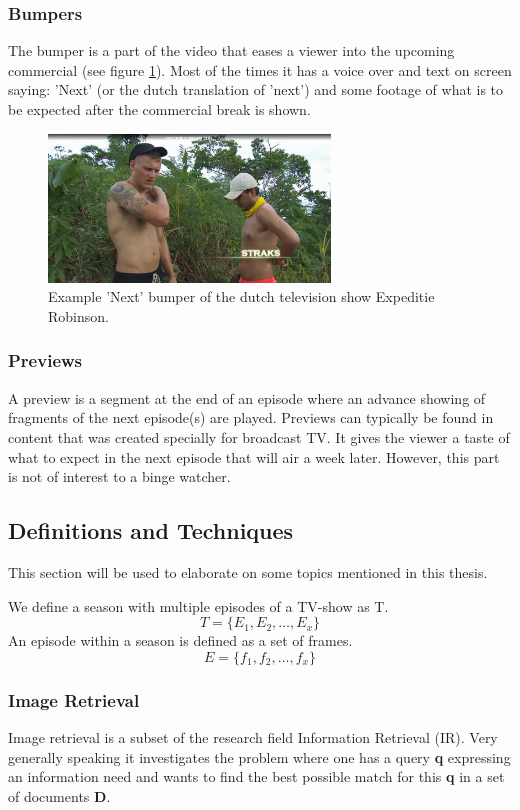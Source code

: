 \documentclass{article}
\begin{document}
\subsubsection{Bumpers}
The bumper is a part of the video that eases a viewer into the upcoming commercial (see figure \ref{examplebumper}). Most of the times it has a voice over and text on screen saying: 'Next' (or the dutch translation of 'next') and some footage of what is to be expected after the commercial break is shown.

\begin{figure}[H]
    \includegraphics[width=7.5cm]{images/straks.png}
    \centering
    \caption{Example 'Next' bumper of the dutch television show Expeditie Robinson.}
    \label{examplebumper}
\end{figure}

\subsubsection{Previews}
A preview is a segment at the end of an episode where an advance showing of fragments of the next episode(s) are played. Previews can typically be found in content that was created specially for broadcast TV. It gives the viewer a taste of what to expect in the next episode that will air a week later. However, this part is not of interest to a binge watcher.

\subsection{Definitions and Techniques}
This section will be used to elaborate on some topics mentioned in this thesis.

We define a season with multiple episodes of a TV-show as T.
\[T = \{E_1, E_2, \dots, E_x\}\]
An episode within a season is defined as a set of frames.
\[E = \{f_1, f_2, \dots, f_x\}\]


\subsubsection{Image Retrieval}
Image retrieval is a subset of the research field Information Retrieval (IR). Very generally speaking it investigates the problem where one has a query \textbf{q} expressing an information need and wants to find the best possible match for this \textbf{q} in a set of documents \textbf{D}.
\end{document}
